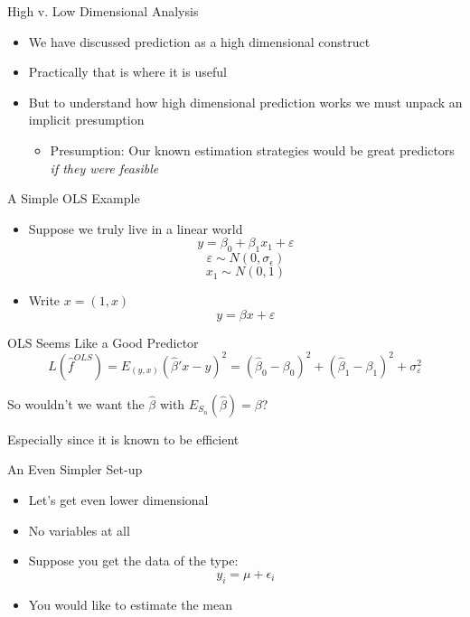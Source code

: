 \documentclass{beamer}
\begin{document}
\begin{frame}{High v. Low Dimensional Analysis}
	\begin{itemize}
		\item We have discussed prediction as a high dimensional construct
		\vspace*{0.5cm}
		\item Practically that is where it is useful
		\vspace*{0.5cm}
		\item But to understand how high dimensional prediction works we must unpack an implicit presumption
		\begin{itemize}
			\item Presumption: Our known estimation strategies would be great predictors \textit{if they were feasible}
		\end{itemize}
	\end{itemize}
\end{frame}

\begin{frame}{A Simple OLS Example}
	\begin{itemize}
		\item Suppose we truly live in a linear world
		$$y=\beta_0+\beta_1x_1+\varepsilon$$
		$$\varepsilon\sim N(0,\sigma_\epsilon)$$
		$$x_1\sim N(0,1)$$
		\item Write $x=(1,x)$
		$$y=\beta x+\varepsilon$$
	\end{itemize}
\end{frame}

\begin{frame}{OLS Seems Like a Good Predictor}
		$$L(\hat{f}^{OLS})=E_{(y,x)}(\hat{\beta}'x-y)^2=(\hat{\beta}_0-\beta_0)^2+(\hat{\beta}_1-\beta_1)^2+\sigma_\varepsilon^2$$

	So wouldn't we want the $\hat{\beta}$ with $E_{S_n}(\hat{\beta})=\beta$?
		
	\vspace*{0.5cm}
	Especially since it is known to be efficient
\end{frame}

\begin{frame}{An Even Simpler Set-up}
	\begin{itemize}
		\item Let's get even lower dimensional
		\item No variables at all
		\item Suppose you get the data of the type:
		$$y_i=\mu+\epsilon_i$$
		\item You would like to estimate the mean
	\end{itemize}
\end{frame}
\end{document}
